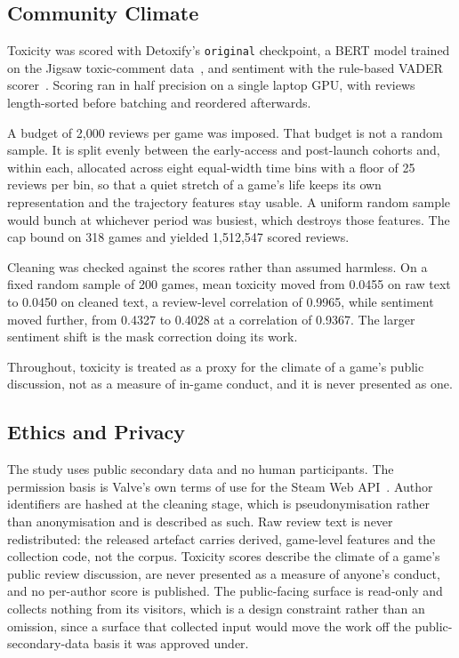 \documentclass[sigconf]{acmart}
\begin{document}
\subsection{Community Climate}
\label{sec:dataClimate}

Toxicity was scored with Detoxify's \texttt{original} checkpoint, a BERT model trained on the
Jigsaw toxic-comment data~\cite{Borkan2019,Detoxify2020}, and sentiment with the rule-based VADER
scorer~\cite{HuttoGilbert2014}. Scoring ran in half precision on a single laptop GPU, with reviews
length-sorted before batching and reordered afterwards.

A budget of 2,000 reviews per game was imposed. That budget is not a random sample. It is split
evenly between the early-access and post-launch cohorts and, within each, allocated across eight
equal-width time bins with a floor of 25 reviews per bin, so that a quiet stretch of a game's life
keeps its own representation and the trajectory features stay usable. A uniform random sample would
bunch at whichever period was busiest, which destroys those features. The cap bound on 318 games
and yielded 1,512,547 scored reviews.

Cleaning was checked against the scores rather than assumed harmless. On a fixed random sample of
200 games, mean toxicity moved from 0.0455 on raw text to 0.0450 on cleaned text, a review-level
correlation of 0.9965, while sentiment moved further, from 0.4327 to 0.4028 at a correlation of
0.9367. The larger sentiment shift is the mask correction doing its work.

Throughout, toxicity is treated as a proxy for the climate of a game's public discussion, not as a
measure of in-game conduct, and it is never presented as one.

\subsection{Ethics and Privacy}
\label{sec:dataEthics}

The study uses public secondary data and no human participants. The permission basis is Valve's own
terms of use for the Steam Web API~\cite{ValveAPITerms}. Author identifiers are hashed at the
cleaning stage, which is pseudonymisation rather than anonymisation and is described as such. Raw
review text is never redistributed: the released artefact carries derived, game-level features and
the collection code, not the corpus. Toxicity scores describe the climate of a game's public review
discussion, are never presented as a measure of anyone's conduct, and no per-author score is
published. The public-facing surface is read-only and collects nothing from its visitors, which is
a design constraint rather than an omission, since a surface that collected input would move the
work off the public-secondary-data basis it was approved under.
\end{document}
